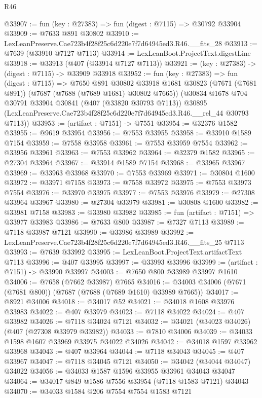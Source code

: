 \begin{lexlean}{R46}
\begin{coremodule}
@33907 := fun (key : @27383) => fun (digest : @7115) => @30792 @33904
@33909 := @7633 @891 @30802
@33910 := LexLeanPreserve.Cae723b4f28f25c6d220e7f7d64945ed3.R46.__fits_28
@33913 := @7639 (@33910 @7127 @7113)
@33914 := LexLeanBoot.ProjectText.digestLine
@33918 := @33913 (@407 (@33914 @7127 @7113))
@33921 := (key : @27383) -> (digest : @7115) -> @33909 @33918
@33952 := fun (key : @27383) =>
  fun (digest : @7115) =>
  @7650
    @891
    @30802
    @33918
    @1681
    @30823
    (@7671 (@7681 @891))
    (@7687 (@7688 (@7689 @1681) @30802 @7665))
    (@30834
      @1678
      @704
      @30791
      @33904
      @30841
      (@407 (@33820 @30793 @7113))
      @30895
      (LexLeanPreserve.Cae723b4f28f25c6d220e7f7d64945ed3.R46.__rel_44 @30793 @7113))
@33953 := (artifact : @7151) -> @7551
@33954 := @32376 @1582
@33955 := @9619 @33954
@33956 := @7553 @33955
@33958 := @33910 @1589 @7154
@33959 := @7558 @33958
@33961 := @7553 @33959 @7554
@33962 := @33956 @33961
@33963 := @7553 @33962
@33964 := @32379 @1582
@33965 := @27304 @33964
@33967 := @33914 @1589 @7154
@33968 := @33965 @33967
@33969 := @33963 @33968
@33970 := @7553 @33969
@33971 := @30804 @1600
@33972 := @33971 @7158
@33973 := @7558 @33972
@33975 := @7553 @33973 @7554
@33976 := @33970 @33975
@33977 := @7553 @33976
@33979 := @27308 @33964 @33967
@33980 := @27304 @33979
@33981 := @30808 @1600
@33982 := @33981 @7158
@33983 := @33980 @33982
@33985 := fun (artifact : @7151) => @33977 @33983
@33986 := @7633 @800
@33987 := @7327 @7113
@33989 := @7118 @33987 @7121
@33990 := @33986 @33989
@33992 := LexLeanPreserve.Cae723b4f28f25c6d220e7f7d64945ed3.R46.__fits_25 @7113
@33993 := @7639 @33992
@33995 := LexLeanBoot.ProjectText.artifactText @7113
@33996 := @407 @33995
@33997 := @33993 @33996
@33999 := (artifact : @7151) -> @33990 @33997
@34003 := @7650 @800 @33989 @33997 @1610
@34006 := @7658 (@7662 @33987) @7665
@34016 := @34003 @34006 (@7671 (@7681 @800)) (@7687 (@7688 (@7689 @1610) @33989 @7665))
@34017 := @8921 @34006
@34018 := @34017 @52
@34021 := @34018 @1608 @33976 @33983
@34022 := @407 @33979
@34023 := @7118 @34022
@34024 := @407 @33982
@34026 := @7118 @34024 @7121
@34032 := @34021 (@34023 @34026) (@407 (@27308 @33979 @33982))
@34033 := @7810 @34006
@34039 := @34033 @1598 @1607 @33969 @33975 @34022 @34026
@34042 := @34018 @1597 @33962 @33968
@34043 := @407 @33964
@34044 := @7118 @34043
@34045 := @407 @33967
@34047 := @7118 @34045 @7121
@34050 := @34042 (@34044 @34047) @34022
@34056 := @34033 @1587 @1596 @33955 @33961 @34043 @34047
@34064 := @34017 @849 @1586 @7556 @33954 (@7118 @1583 @7121) @34043
@34070 := @34033 @1584 @206 @7554 @7554 @1583 @7121

\end{coremodule}
\end{lexlean}
